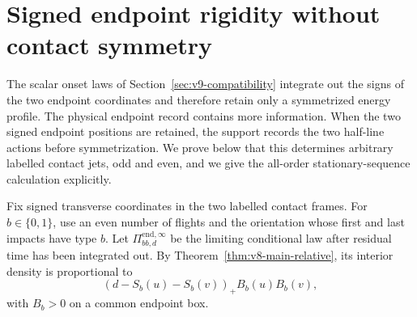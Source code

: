 \section{Signed endpoint rigidity without contact symmetry}
\label{sec:v21-signed-rigidity}

The scalar onset laws of Section~\ref{sec:v9-compatibility} integrate out the
signs of the two endpoint coordinates and therefore retain only a
symmetrized energy profile.  The physical endpoint record contains more
information.  When the two signed endpoint positions are retained, the
support records the two half-line actions before symmetrization.  We prove
below that this determines arbitrary labelled contact jets, odd and even,
and we give the all-order stationary-sequence calculation explicitly.

Fix signed transverse coordinates in the two labelled contact frames.  For
$b\in\{0,1\}$, use an even number of flights and the orientation whose first
and last impacts have type $b$.  Let
$\Pi^{\mathrm{end},\infty}_{bb,d}$ be the limiting conditional law after
residual time has been integrated out.  By
Theorem~\ref{thm:v8-main-relative}, its interior density is proportional to
\begin{equation}\label{eq:v21-signed-endpoint-density}
 (d-S_b(u)-S_b(v))_+B_b(u)B_b(v),
\end{equation}
with $B_b>0$ on a common endpoint box.


